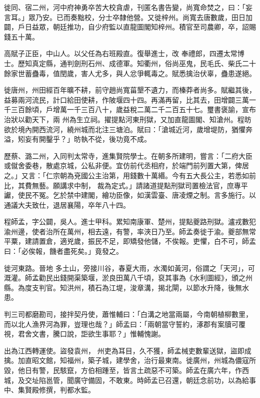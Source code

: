 \begin{pinyinscope}
 徙同、宿二州，河中府神勇卒苦大校貪虐，刊匿名書告變，尚寬命焚之，曰：「妄言耳。」眾乃安。已而奏黜校，分士卒隸他營。又徙梓州。尚寬去唐數歲，田日加闢，戶日益眾，朝廷推功，自少府監以直龍圖閣知梓州。積官至司農卿，卒，詔賜錢五十萬。



 高賦子正臣，中山人。以父任為右班殿直。復舉進士，改
 奉禮郎，四遷太常博士。歷知真定縣，通判劍刑石州、成德軍。知衢州，俗尚巫鬼，民毛氏、柴氏二十餘家世蓄蠱毒，值閏歲，害人尤多，與人忿爭輒毒之。賦悉擒治伏辜，蠱患遂絕。



 徙唐州，州田經百年曠不耕，前守趙尚寬菑墾不遺力，而榛莽者尚多。賦繼其後，益募兩河流民，計口給田使耕，作陂堰四十四。再滿再留，比其去，田增闢三萬一千三百餘頃，戶增萬一千三百八十，歲益稅二萬二千二百五十七。璽書褒諭，宣布治狀以勸天下，兩
 州為生立祠。擢提點河東刑獄，又加直龍圖閣、知滄州。程昉欲於境內開西流河，繞州城而北注三塘泊。賦曰：「滄城近河，歲增堤防，猶懼奔溢，矧妄有開鑿乎？」昉執不從，後功竟不成。



 歷蔡、潞二州，入同判太常寺，進集賢院學士。在朝多所建明，嘗言：「二府大臣或僦舍委巷，散處京城，公私非便。宜仿前代丞相府，於端門前列置大第，俾居之。」又言：「仁宗朝為兗國公主治第，用錢數十萬緡。今有五大長公主，若悉如前比，其費無藝。願講求中制，
 裁為定式。」請諸道提點刑獄司置檢法官，庶專平讞，使民不冤。乞於禁中建閣，繪功臣像，如漢雲臺、唐凌煙之制。言多施行。以通議大夫致仕，退居襄陽，卒年八十四。



 程師孟，字公闢，吳人。進士甲科。累知南康軍、楚州，提點夔路刑獄。瀘戎數犯渝州邊，使者治所在萬州，相去遠，有警，率浹日乃至。師孟奏徙于渝。夔部無常平粟，建請置倉，適兇歲，振民不足，即矯發他儲，不俟報。吏懼，白不可，師孟曰：「必俟報，饑者盡死矣。」竟發之。



 徙河東路。晉地
 多土山，旁接川谷，春夏大雨，水濁如黃河，俗謂之「天河」，可溉灌。師孟勸民出錢開渠築堰，淤良田萬八千頃，裒其事為《水利圖經》，頒之州縣。為度支判官。知洪州，積石為江堤，浚章溝，揭北閘，以節水升降，後無水患。



 判三司都磨勘司，接拌契丹使，蕭惟輔曰：「白溝之地當兩屬，今南朝植柳數里，而以北人漁界河為罪，豈理也哉？」師孟曰：「兩朝當守誓約，涿郡有案牘可覆視，君舍文書，騰口說，詎欲生事耶？」惟輔愧謝。



 出為江西轉運使。盜發袁州，
 州吏為耳目，久不獲，師孟械吏數輩送獄，盜即成擒。加直昭文館，知福州，築子城，建學舍，治行最東南。徙廣州，州城為儂寇所毀，他日有警，民駭竄，方伯相踵至，皆言土疏惡不可築。師孟在廣六年，作西城，及交址陷邕管，聞廣守備固，不敢東。時師孟已召還，朝廷念前功，以為給事中、集賢殿修撰，判都水監。




\end{pinyinscope}
